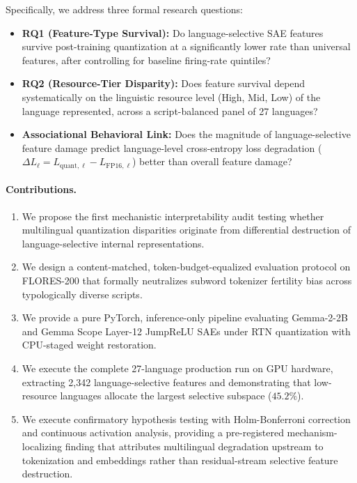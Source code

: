 \documentclass[11pt]{article}
\begin{document}
Specifically, we address three formal research questions:
\begin{itemize}
    \item \textbf{RQ1 (Feature-Type Survival):} Do language-selective SAE features survive post-training quantization at a significantly lower rate than universal features, after controlling for baseline firing-rate quintiles?
    \item \textbf{RQ2 (Resource-Tier Disparity):} Does feature survival depend systematically on the linguistic resource level (High, Mid, Low) of the language represented, across a script-balanced panel of 27 languages?
    \item \textbf{Associational Behavioral Link:} Does the magnitude of language-selective feature damage predict language-level cross-entropy loss degradation ($\Delta L_\ell = L_{\text{quant},\ell} - L_{\text{FP16},\ell}$) better than overall feature damage?
\end{itemize}

\paragraph{Contributions.}
\begin{enumerate}
    \item We propose the first mechanistic interpretability audit testing whether multilingual quantization disparities originate from differential destruction of language-selective internal representations.
    \item We design a content-matched, token-budget-equalized evaluation protocol on FLORES-200 that formally neutralizes subword tokenizer fertility bias across typologically diverse scripts.
    \item We provide a pure PyTorch, inference-only pipeline evaluating Gemma-2-2B and Gemma Scope Layer-12 JumpReLU SAEs under RTN quantization with CPU-staged weight restoration.
    \item We execute the complete 27-language production run on GPU hardware, extracting 2,342 language-selective features and demonstrating that low-resource languages allocate the largest selective subspace ($45.2\%$).
    \item We execute confirmatory hypothesis testing with Holm-Bonferroni correction and continuous activation analysis, providing a pre-registered mechanism-localizing finding that attributes multilingual degradation upstream to tokenization and embeddings rather than residual-stream selective feature destruction.
\end{enumerate}
\end{document}
